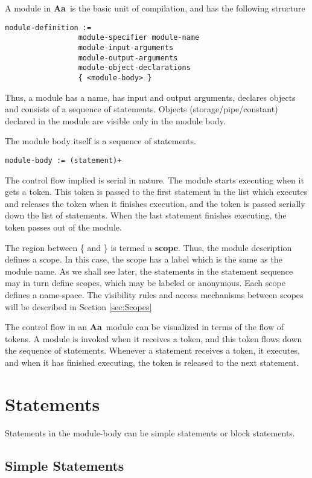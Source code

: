 \documentclass{article}
\newcommand{\Aa}{{\bf Aa}~}
\begin{document}
A module in \Aa is the basic unit of compilation, and
has the following structure
\begin{verbatim}
module-definition :=  
                 module-specifier module-name  
                 module-input-arguments
                 module-output-arguments
                 module-object-declarations
                 { <module-body> }
\end{verbatim}
Thus, a module has a name, has input and output arguments,
declares objects and consists of a sequence of statements.
Objects (storage/pipe/constant) declared in the module are visible only in the
module body. 

The module body itself is a sequence of statements.
\begin{verbatim}
module-body := (statement)+
\end{verbatim}
The control flow implied is serial in nature.  The
module starts executing when it gets a token.
This token is passed to the first statement in the
list which executes and releases the token when it
finishes execution, and the token  is passed serially down the
list of statements.  When the last statement finishes 
executing, the token passes out of the module.

The region between \{ and \} is termed a {\bf scope}.  Thus, 
the module description defines a scope.  In this case, 
the scope has a label which is the same as the module name.
As we shall see later, the statements in the statement sequence
may in turn define scopes, which may be labeled or anonymous.
Each scope defines a name-space.  The visibility
rules and access mechanisms between scopes will be described
in Section \ref{sec:Scopes}

The control flow in an \Aa module can be visualized
in terms of the flow of tokens.
A module is invoked when it receives a token, and 
this token flows down the sequence of statements.
Whenever a statement receives a token, it executes,
and when it has finished executing, the token is
released to the next statement. 

\section{Statements}
 
Statements in the module-body can be simple statements
or block statements.

\subsection{Simple Statements}
\end{document}
